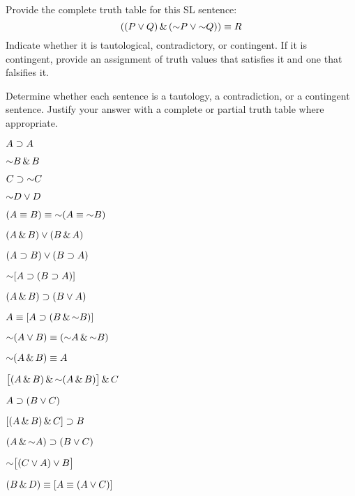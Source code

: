 \problempart
\label{HW3.A}
Provide the complete truth table for this SL sentence:
$$((P \eor Q) \eand (\enot P \eor \enot Q)) \eiff R$$
Indicate whether it is tautological, contradictory, or contingent. If it is contingent, provide an assignment of truth values that satisfies it and one that falsifies it.



\solutions
\problempart
\label{pr.TT.TTorC}
Determine whether each sentence is a tautology, a contradiction, or a contingent sentence. Justify your answer with a complete or partial truth table where appropriate.
\begin{earg}
\item $A \supset A$ %
\item $\enot B \eand B$ %
\item $C \eif\enot C$ %
\item $\enot D \eor D$ %
\item $(A \eiff B) \eiff \enot(A\eiff \enot B)$ %
\item $(A\,\&\, B) \vee (B\,\&\, A)$ %
\item $(A \supset B) \vee (B \supset A)$ %
\item $\enot[A \eif (B \eif A)]$ %
\item $(A \,\&\, B) \supset (B \vee A)$  %
\item $A \eiff [A \eif (B \eand \enot B)]$ %
\item $\enot(A \eor B) \eiff (\enot A \eand \enot B)$ %
\item $\enot(A\eand B) \eiff A$ %
\item $\bigl[(A\eand B) \eand\enot(A\eand B)\bigr] \eand C$ %
\item $A\supset(B\vee C)$ %
\item $[(A \,\&\, B) \,\&\, C] \supset B$ %
\item $(A \eand\enot A) \eif (B \eor C)$ %
\item $\enot\bigl[(C\eor A) \eor B\bigr]$ %
\item $(B\,\&\, D) \equiv [A \equiv(A \vee C)]$%
\end{earg}


